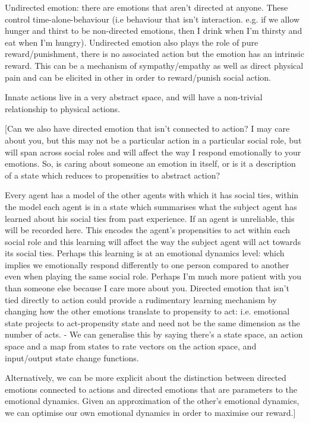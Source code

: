 \documentclass[a4paper]{article}
\begin{document}
Undirected emotion: there are emotions that aren't directed at anyone. These control time-alone-behaviour (i.e behaviour that isn't interaction. e.g. if we allow hunger and thirst to be non-directed emotions, then I drink when I'm thirsty and eat when I'm hungry). Undirected emotion also plays the role of pure reward/punishment, there is no associated action but the emotion has an intrinsic reward. This can be a mechanism of sympathy/empathy as well as direct physical pain and can be elicited in other in order to reward/punish social action.

Innate actions live in a very abstract space, and will have a non-trivial relationship to physical actions.

[Can we also have directed emotion that isn't connected to action? I may care about you, but this may not be a particular action in a particular social role, but will span across social roles and will affect the way I respond emotionally to your emotions. So, is caring about someone an emotion in itself, or is it a description of a state which reduces to propensities to abstract action?

Every agent has a model of the other agents with which it has social ties, within the model each agent is in a state which summarises what the subject agent has learned about his social ties from past experience. If an agent is unreliable, this will be recorded here. This encodes the agent's propensities to act within each social role and this learning will affect the way the subject agent will act towards its social ties. Perhaps this learning is at an emotional dynamics level: which implies we emotionally respond differently to one person compared to another even when playing the same social role. Perhaps I'm much more patient with you than someone else because I care more about you. Directed emotion that isn't tied directly to action could provide a rudimentary learning mechanism by changing how the other emotions translate to propensity to act: i.e. emotional state projects to act-propensity state and need not be the same dimension as the number of acts. - We can generalise this by saying there's a state space, an action space and a map from states to rate vectors on the action space, and input/output state change functions.

Alternatively, we can be more explicit about the distinction between directed emotions connected to actions and directed emotions that are parameters to the emotional dynamics. Given an approximation of the other's emotional dynamics, we can optimise our own emotional dynamics in order to maximise our reward.]
\end{document}
